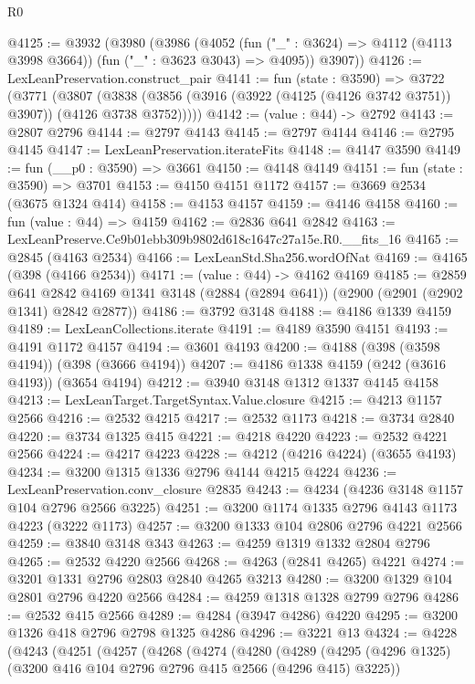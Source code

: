 \begin{lexlean}{R0}
\begin{coremodule}
@4125 := @3932
    (@3980
      (@3986
        (@4052 (fun ("_" : @3624) => @4112 (@4113 @3998 @3664)) (fun ("_" : @3623 @3043) => @4095))
        @3907))
@4126 := LexLeanPreservation.construct_pair
@4141 := fun (state : @3590) =>
  @3722
    (@3771
      (@3807 (@3838 (@3856 (@3916 (@3922 (@4125 (@4126 @3742 @3751)) @3907)) (@4126 @3738 @3752)))))
@4142 := (value : @44) -> @2792
@4143 := @2807 @2796
@4144 := @2797 @4143
@4145 := @2797 @4144
@4146 := @2795 @4145
@4147 := LexLeanPreservation.iterateFits
@4148 := @4147 @3590
@4149 := fun (__p0 : @3590) => @3661
@4150 := @4148 @4149
@4151 := fun (state : @3590) => @3701
@4153 := @4150 @4151 @1172
@4157 := @3669 @2534 (@3675 @1324 @414)
@4158 := @4153 @4157
@4159 := @4146 @4158
@4160 := fun (value : @44) => @4159
@4162 := @2836 @641 @2842
@4163 := LexLeanPreserve.Ce9b01ebb309b9802d618c1647c27a15e.R0.__fits_16
@4165 := @2845 (@4163 @2534)
@4166 := LexLeanStd.Sha256.wordOfNat
@4169 := @4165 (@398 (@4166 @2534))
@4171 := (value : @44) -> @4162 @4169
@4185 := @2859
    @641
    @2842
    @4169
    @1341
    @3148
    (@2884 (@2894 @641))
    (@2900 (@2901 (@2902 @1341) @2842 @2877))
@4186 := @3792 @3148
@4188 := @4186 @1339 @4159
@4189 := LexLeanCollections.iterate
@4191 := @4189 @3590 @4151
@4193 := @4191 @1172 @4157
@4194 := @3601 @4193
@4200 := @4188 (@398 (@3598 @4194)) (@398 (@3666 @4194))
@4207 := @4186 @1338 @4159 (@242 (@3616 @4193)) (@3654 @4194)
@4212 := @3940 @3148 @1312 @1337 @4145 @4158
@4213 := LexLeanTarget.TargetSyntax.Value.closure
@4215 := @4213 @1157 @2566
@4216 := @2532 @4215
@4217 := @2532 @1173
@4218 := @3734 @2840
@4220 := @3734 @1325 @415
@4221 := @4218 @4220
@4223 := @2532 @4221 @2566
@4224 := @4217 @4223
@4228 := @4212 (@4216 @4224) (@3655 @4193)
@4234 := @3200 @1315 @1336 @2796 @4144 @4215 @4224
@4236 := LexLeanPreservation.conv_closure @2835
@4243 := @4234 (@4236 @3148 @1157 @104 @2796 @2566 @3225)
@4251 := @3200 @1174 @1335 @2796 @4143 @1173 @4223 (@3222 @1173)
@4257 := @3200 @1333 @104 @2806 @2796 @4221 @2566
@4259 := @3840 @3148 @343
@4263 := @4259 @1319 @1332 @2804 @2796
@4265 := @2532 @4220 @2566
@4268 := @4263 (@2841 @4265) @4221
@4274 := @3201 @1331 @2796 @2803 @2840 @4265 @3213
@4280 := @3200 @1329 @104 @2801 @2796 @4220 @2566
@4284 := @4259 @1318 @1328 @2799 @2796
@4286 := @2532 @415 @2566
@4289 := @4284 (@3947 @4286) @4220
@4295 := @3200 @1326 @418 @2796 @2798 @1325 @4286
@4296 := @3221 @13
@4324 := @4228
    (@4243
      (@4251
        (@4257
          (@4268
            (@4274
              (@4280
                (@4289
                  (@4295 (@4296 @1325) (@3200 @416 @104 @2796 @2796 @415 @2566 (@4296 @415) @3225))

\end{coremodule}
\end{lexlean}
